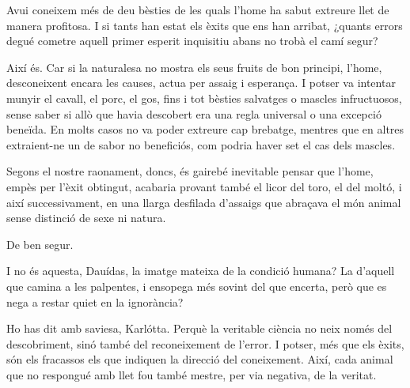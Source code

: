 \begin{platdialogue}
\item[\speaker{Rógos:}] Avui coneixem més de deu bèsties de les quals l’home ha sabut extreure llet de manera profitosa. I si tants han estat els èxits que ens han arribat, ¿quants errors degué cometre aquell primer esperit inquisitiu abans no trobà el camí segur?
\item[\speaker{Dauídas:}] Així és. Car si la naturalesa no mostra els seus fruits de bon principi, l’home, desconeixent encara les causes, actua per assaig i esperança. I potser va intentar munyir el cavall, el porc, el gos, fins i tot bèsties salvatges o mascles infructuosos, sense saber si allò que havia descobert era una regla universal o una excepció beneïda. En molts casos no va poder extreure cap brebatge, mentres que en altres extraient-ne un de sabor no beneficiós, com podria haver set el cas dels mascles.
\item[\speaker{Rógos:}] Segons el nostre raonament, doncs, és gairebé inevitable pensar que l’home, empès per l’èxit obtingut, acabaria provant també el licor del toro, el del moltó, i així successivament, en una llarga desfilada d’assaigs que abraçava el món animal sense distinció de sexe ni natura.
\item[\speaker{Dauídas:}] De ben segur.
\item[\speaker{Karlótta:}] I no és aquesta, Dauídas, la imatge mateixa de la condició humana? La d’aquell que camina a les palpentes, i ensopega més sovint del que encerta, però que es nega a restar quiet en la ignorància?
\item[\speaker{Dauídas:}]Ho has dit amb saviesa, Karlótta. Perquè la veritable ciència no neix només del descobriment, sinó també del reconeixement de l’error. I potser, més que els èxits, són els fracassos els que indiquen la direcció del coneixement. Així, cada animal que no respongué amb llet fou també mestre, per via negativa, de la veritat.
\end{platdialogue}